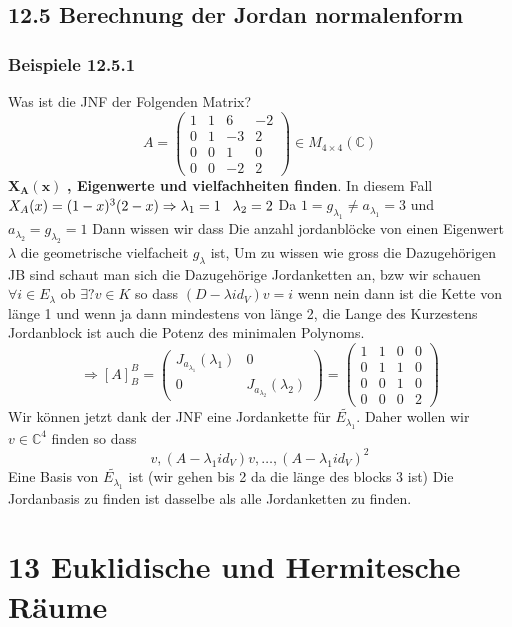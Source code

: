 \documentclass{article}
\newcommand{\smspc}{\hspace{0.3cm}}
\newcommand{\beispiel}[1]{\subsubsection*{Beispiele {#1}}}
\begin{document}
\subsection*{12.5 Berechnung der Jordan normalenform}
\beispiel{12.5.1} Was ist die JNF der Folgenden Matrix?\[A=\begin{pmatrix}1&1&6&-2\\0&1&-3&2\\0&0&1&0\\0&0&-2&2\end{pmatrix}\in M_{4\times4}(\mathbb{C})\]
$\mathbf{X_A(x)}$ \textbf{, Eigenwerte und vielfachheiten finden}. In diesem Fall $X_A(x)= (1-x)^3(2-x)\Rightarrow \lambda_1=1\smspc\lambda_2=2$ Da $1=g_{\lambda_1}\neq a_{\lambda_1}=3$
und $a_{\lambda_2}=g_{\lambda_2}=1$ Dann wissen wir dass Die anzahl jordanblöcke von einen Eigenwert $\lambda$ die geometrische vielfacheit $g_\lambda$ ist, Um zu wissen wie gross die Dazugehörigen JB sind schaut man sich die Dazugehörige Jordanketten an, bzw wir schauen $\forall i\in E_\lambda$ ob $\exists?v\in K$ so dass $(D-\lambda id_V)v=i$ wenn nein dann ist die Kette von länge 1 und wenn ja dann mindestens von länge 2, die Lange des Kurzestens Jordanblock ist auch die Potenz des minimalen Polynoms. \[\Rightarrow[A]_B^B=\begin{pmatrix}J_{a_{\lambda_1}}(\lambda_1)&0\\0&J_{a_{\lambda_2}}(\lambda_2)\end{pmatrix}=\begin{pmatrix}1&1&0&0\\0&1&1&0\\0&0&1&0\\0&0&0&2\end{pmatrix}\]
Wir können jetzt dank der JNF eine Jordankette für $\tilde{E_{\lambda_1}}$. Daher wollen wir $v\in \mathbb{C}^4$ finden so dass \[v, (A-\lambda_1 id_V)v, \hdots , (A-\lambda_1 id_V)^2\] Eine Basis von $\tilde{E_{\lambda_1}}$ ist (wir gehen bis 2 da die länge des blocks 3 ist)
Die Jordanbasis zu finden ist dasselbe als alle Jordanketten zu finden.
\section*{13 Euklidische und Hermitesche Räume}
\end{document}
